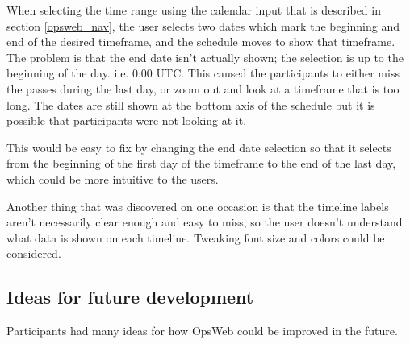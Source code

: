 When selecting the time range using the calendar input that is described in section \ref{opsweb_nav}, the user selects two dates which mark the beginning and end of the desired timeframe, and the schedule moves to show that timeframe. The problem is that the end date isn't actually shown; the selection is up to the beginning of the day. i.e. 0:00 UTC. This caused the participants to either miss the passes during the last day, or zoom out and look at a timeframe that is too long. The dates are still shown at the bottom axis of the schedule but it is possible that participants were not looking at it.

This would be easy to fix by changing the end date selection so that it selects from the beginning of the first day of the timeframe to the end of the last day, which could be more intuitive to the users.

Another thing that was discovered on one occasion is that the timeline labels aren't necessarily clear enough and easy to miss, so the user doesn't understand what data is shown on each timeline. Tweaking font size and colors could be considered.

\subsection{Ideas for future development}
Participants had many ideas for how OpsWeb could be improved in the future.